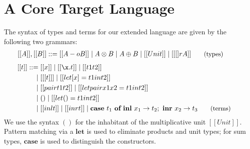 \section{A Core Target Language}
\label{sec:linear-base-calculus}
The syntax of types and terms for our extended language are given by the
following two grammars:
\begin{align*}
  \hspace{-0.9em}[[ A ]] , [[ B ]] & ::=
         [[ A -o B ]]
    \mid A \otimes B 
    \mid A \oplus B
    \mid [[ Unit ]]
    \mid [[ [] r A ]]
  {\small{\tag{types}}}
  \end{align*}
\begin{align*}
\hspace{-0.8em} [[ t ]] ::= \;
       & [[ x ]]
  \mid [[ \x . t ]]
  \mid [[ t1 t2 ]]
  \\ \mid \; & [[ [t] ]]
  \mid [[ let [ x ] = t1 in t2 ]]
  \\  \mid \; & [[ pair t1 t2 ]]
  \mid [[ letpair x1 x2 = t1 in t2 ]] \\
  \mid \; & () \mid [[ let () = t1 in t2 ]]
\\ \mid \; & [[ inl t ]] \mid [[ inr t ]] \mid \textbf{case} \ t_{1}\ \textbf{of}\ \textbf{inl}\ x_{1} \rightarrow t_{2};\ \textbf{inr}\ x_{2} \rightarrow t_{3}
{\small{\tag{terms}}}
\end{align*}
We use the syntax $()$ for the inhabitant of  the multiplicative unit $[[ Unit ]]$.
Pattern matching via a $\textbf{let}$ is used to eliminate products and unit
types; for sum types, $\textbf{case}$ is used to distinguish the constructors.

